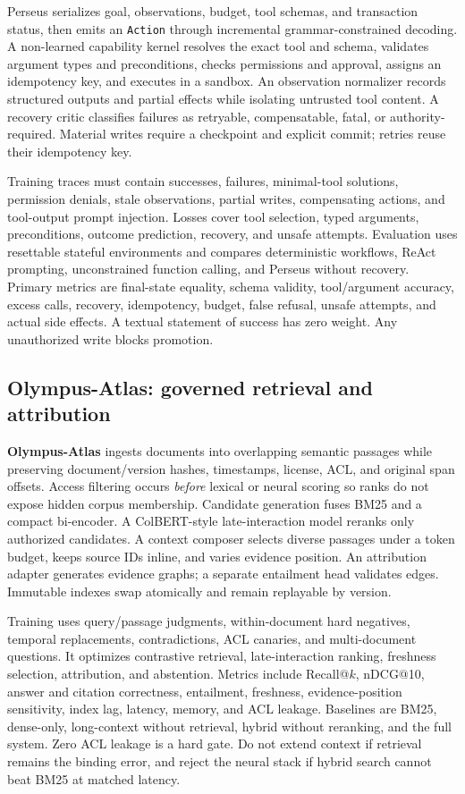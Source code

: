 \documentclass[10pt]{article}
\newcommand{\atlas}{\textbf{Olympus-Atlas}}
\begin{document}
Perseus serializes goal, observations, budget, tool schemas, and transaction
status, then emits an \texttt{Action} through incremental grammar-constrained
decoding. A non-learned capability kernel resolves the exact tool and schema,
validates argument types and preconditions, checks permissions and approval,
assigns an idempotency key, and executes in a sandbox. An observation normalizer
records structured outputs and partial effects while isolating untrusted tool
content. A recovery critic classifies failures as retryable, compensatable,
fatal, or authority-required. Material writes require a checkpoint and explicit
commit; retries reuse their idempotency key.

Training traces must contain successes, failures, minimal-tool solutions,
permission denials, stale observations, partial writes, compensating actions,
and tool-output prompt injection. Losses cover tool selection, typed arguments,
preconditions, outcome prediction, recovery, and unsafe attempts. Evaluation
uses resettable stateful environments and compares deterministic workflows,
ReAct prompting, unconstrained function calling, and Perseus without recovery.
Primary metrics are final-state equality, schema validity, tool/argument
accuracy, excess calls, recovery, idempotency, budget, false refusal, unsafe
attempts, and actual side effects. A textual statement of success has zero
weight. Any unauthorized write blocks promotion.

\subsection{Olympus-Atlas: governed retrieval and attribution}

\atlas{} ingests documents into overlapping semantic passages while preserving
document/version hashes, timestamps, license, ACL, and original span offsets.
Access filtering occurs \emph{before} lexical or neural scoring so ranks do not
expose hidden corpus membership. Candidate generation fuses BM25 and a compact
bi-encoder. A ColBERT-style late-interaction model reranks only authorized
candidates. A context composer selects diverse passages under a token budget,
keeps source IDs inline, and varies evidence position. An attribution adapter
generates evidence graphs; a separate entailment head validates edges. Immutable
indexes swap atomically and remain replayable by version.

Training uses query/passage judgments, within-document hard negatives, temporal
replacements, contradictions, ACL canaries, and multi-document questions. It
optimizes contrastive retrieval, late-interaction ranking, freshness selection,
attribution, and abstention. Metrics include Recall@$k$, nDCG@10, answer and
citation correctness, entailment, freshness, evidence-position sensitivity,
index lag, latency, memory, and ACL leakage. Baselines are BM25, dense-only,
long-context without retrieval, hybrid without reranking, and the full system.
Zero ACL leakage is a hard gate. Do not extend context if retrieval remains the
binding error, and reject the neural stack if hybrid search cannot beat BM25 at
matched latency.
\end{document}
